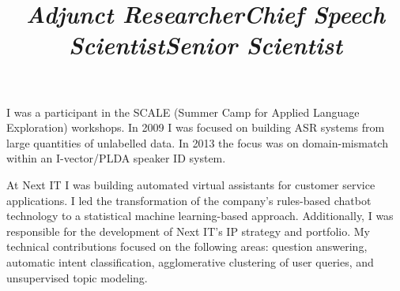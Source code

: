 \documentclass[11pt]{res} %
\newenvironment{indentedblock*}[1][\parindent]
  {%
    \par
    \medskip
    \leftskip#1\relax
  }
  {%
    \par
    \medskip
  }
\begin{document}
\begin{resume}
\begin{position}
\begin{indentedblock*}[.1in]
\end{indentedblock*}

\end{position}


\pagebreak[3]

\title{{\sl Adjunct Researcher}}
\begin{position}

\vspace{-.4in}
\begin{indentedblock*}[.1in]

I was a participant in the SCALE (Summer Camp for Applied Language Exploration) workshops. In 2009 I was focused on building ASR systems from large quantities of unlabelled data. In 2013 the focus was on domain-mismatch within an I-vector/PLDA speaker ID system.

\end{indentedblock*}

\end{position}

\pagebreak[3]
\title{{\sl Chief Speech Scientist}}
\begin{position}

\vspace{-.4in}

\begin{indentedblock*}[.1in]
At Next IT I was building automated virtual assistants for customer service applications. I led the transformation of the company's rules-based chatbot technology to a statistical machine learning-based approach. Additionally, I was responsible for the development of Next IT's IP strategy and portfolio. My technical contributions focused on the following areas: question answering, automatic intent classification, agglomerative clustering of user queries, and unsupervised topic modeling.

\end{indentedblock*}
\end{position}

\pagebreak[3]

\title{{\sl Senior Scientist}}
\begin{position}


\end{position}
\end{resume}
\end{document}
